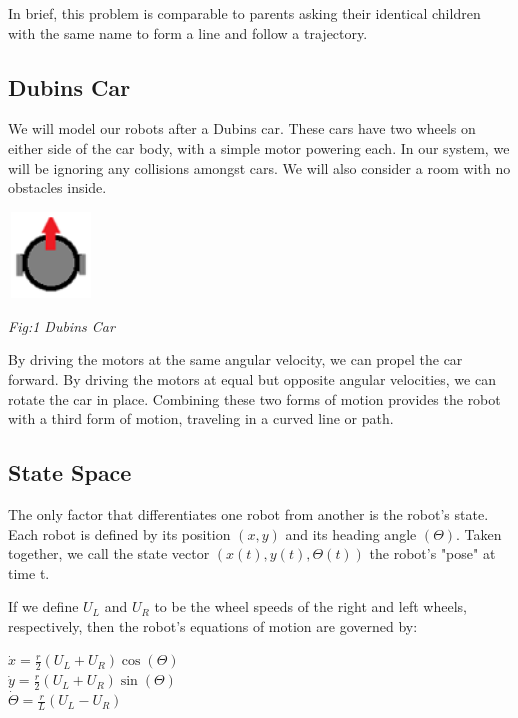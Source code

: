 \documentclass[journal]{IEEEtran}
\begin{document}
    In brief, this problem is comparable to parents asking their identical children with the same name to form a line and follow a trajectory.

\subsection{Dubins Car}
    We will model our robots after a Dubins car. These cars have two wheels on either side of the car body, with a simple motor powering each. In our system, we will be ignoring any collisions amongst cars. We will also consider a room with no obstacles inside.

    \centerline{\includegraphics[width=0.90in,height=0.90in,clip]{dubin_car}}
    \centerline{\textit{Fig:1 Dubins Car}}
    
    By driving the motors at the same angular velocity, we can propel the car forward. By driving the motors at equal but opposite angular velocities, we can rotate the car in place. Combining these two forms of motion provides the robot with a third form of motion, traveling in a curved line or path.

\subsection{State Space}
    The only factor that differentiates one robot from another is the robot's state. Each robot is defined by its position $\left(x,y\right)$ and its heading angle $\left(\Theta\right)$. Taken together, we call the state vector $\left(x\left(t\right),y\left(t\right),\Theta\left(t\right)\right)$ the robot's "pose" at time t.
    
    If we define $U_{L}$ and $U_{R}$ to be the wheel speeds of the right and left wheels, respectively, then the robot's equations of motion are governed by:
    
    \begin{center}
        $\dot{x} = \frac{r}{2}\left(U_{L}+U_{R}\right)\cos(\Theta)$ \\
        $\dot{y} = \frac{r}{2}\left(U_{L}+U_{R}\right)\sin(\Theta)$ \\
        $\dot{\Theta} = \frac{r}{L}\left(U_{L}-U_{R}\right)$
    \end{center}
        
\end{document}
